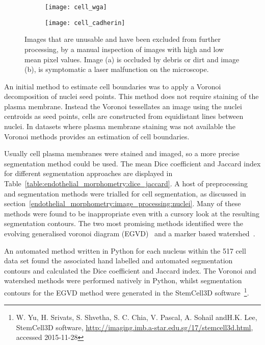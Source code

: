 \begin{figure}[htbp]\centering
	\begin{subfigure}[b]{0.49\linewidth}
		\centering
		\texttt{[image: cell\_wga]}
		\caption{}
		\label{figure:performance_evaluation:antibody_1}
		\vspace{1ex}
	\end{subfigure}
	\begin{subfigure}[b]{0.49\linewidth}
		\centering
		\texttt{[image: cell\_cadherin]}
		\caption{}
		\label{figure:performance_evaluation:antibody_2}
		\vspace{1ex}
	\end{subfigure}
\caption[Excluded images]{Images that are unusable and have been excluded from further processing, by a manual inspection of images with high and low mean pixel values. Image (a) is occluded by debris or dirt and image (b), is symptomatic a laser malfunction on the microscope.}
\label{figure:performance_evaluation:antibody}
\end{figure}

An initial method to estimate cell boundaries was to apply a Voronoi decomposition of nuclei seed points. This method does not require staining of the plasma membrane. Instead the Voronoi tessellates an image using the nuclei centroids as seed points, cells are constructed from equidistant lines between nuclei. In datasets where plasma membrane staining was not available the Voronoi methods provides an estimation of cell boundaries.

Usually cell plasma membranes were stained and imaged, so a more precise segmentation method could be used. The mean Dice coefficient and Jaccard index for different segmentation approaches are displayed in Table~\ref{table:endothelial_morphometry:dice_jaccard}. A host of preprocessing and segmentation methods were trialled for cell segmentation, as discussed in section~\ref{endothelial_morphometry:image_processing:nuclei}. Many of these methods were found to be inappropriate even with a cursory look at the resulting segmentation contours. The two most promising methods identified were the evolving generalised voronoi diagram (EGVD)~\cite{Yu2010} and a marker based watershed~\cite{Roerdink2000}. 

An automated method written in Python for each nucleus within the 517 cell data set found the associated hand labelled and automated segmentation contours and calculated the Dice coefficient and Jaccard index. The Voronoi and watershed methods were performed natively in Python, whilst segmentation contours for the EGVD method  were generated in the StemCell3D software~\footnote{W. Yu, H. Srivats, S. Shvetha, S. C. Chia, V. Pascal, A. Sohail andH.K. Lee, StemCell3D software, \url{http://imaging.imb.a-star.edu.sg/17/stemcell3d.html}, accessed 2015-11-28}.

